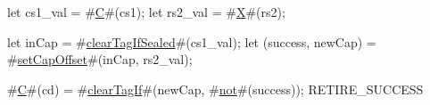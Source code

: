 let cs1_val = #\hyperref[sailRISCVzC]{C}#(cs1);
let rs2_val = #\hyperref[sailRISCVzX]{X}#(rs2);

let inCap = #\hyperref[sailRISCVzclearTagIfSealed]{clearTagIfSealed}#(cs1_val);
let (success, newCap) = #\hyperref[sailRISCVzsetCapOffset]{setCapOffset}#(inCap, rs2_val);

#\hyperref[sailRISCVzC]{C}#(cd) = #\hyperref[sailRISCVzclearTagIf]{clearTagIf}#(newCap, #\hyperref[sailRISCVznot]{not}#(success));
RETIRE_SUCCESS
